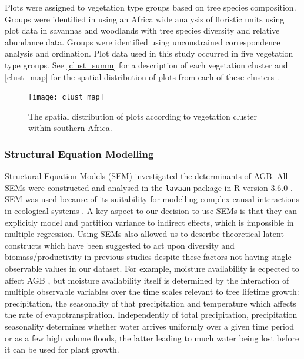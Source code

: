 \documentclass[11pt,a4paper]{article}
\begin{document}
Plots were assigned to vegetation type groups based on tree species composition. Groups were identified in \citet{Fayolle2018} using an Africa wide analysis of floristic units using plot data in savannas and woodlands with tree species diversity and relative abundance data. Groups were identified using unconstrained correspondence analysis and ordination. Plot data used in this study occurred in five vegetation type groups. See \autoref{clust_summ} for a description of each vegetation cluster and \autoref{clust_map} for the spatial distribution of plots from each of these clusters .



\begin{figure}[H]
\centering
	\texttt{[image: clust\_map]}
	\caption{The spatial distribution of plots according to vegetation cluster within southern Africa.}
	\label{clust_map}
\end{figure}

\subsubsection{Structural Equation Modelling}

Structural Equation Models (SEM) investigated the determinants of AGB. All SEMs were constructed and analysed in the \verb|lavaan| package in R version 3.6.0 \citep{R2019}. SEM was used because of its suitability for modelling complex causal interactions in ecological systems \citep{Lee2007}. A key aspect to our decision to use SEMs is that they can explicitly model and partition variance to indirect effects, which is impossible in multiple regression. Using SEMs also allowed us to describe theoretical latent constructs which have been suggested to act upon diversity and biomass/productivity in previous studies despite these factors not having single observable values in our dataset. For example, moisture availability is ecpected to affect AGB \citep{Saito2014, Campbell1996}, but moisture availability itself is determined by the interaction of multiple observable variables over the time scales relevant to tree lifetime growth: precipitation, the seasonality of that precipitation and temperature which affects the rate of evapotranspiration. Independently of total precipitation, precipitation seasonality determines whether water arrives uniformly over a given time period or as a few high volume floods, the latter leading to much water being lost before it can be used for plant growth. 
\end{document}
